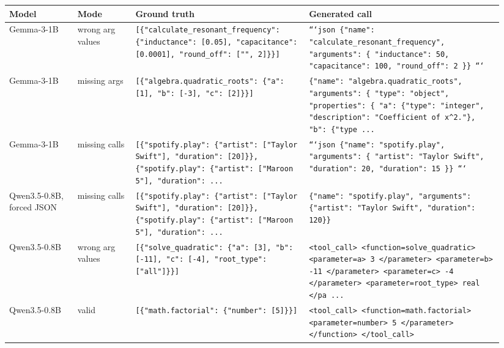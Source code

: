 \begin{tabular}{@{}p{0.13\linewidth}p{0.11\linewidth}p{0.33\linewidth}p{0.37\linewidth}@{}}
\toprule
Model & Mode & Ground truth & Generated call \\
\midrule
Gemma-3-1B & wrong arg values & \raggedright\texttt{[\{"calculate\_\allowbreak{}resonant\_\allowbreak{}frequency": \{"inductance": [0.05], "capacitance": [0.0001], "round\_\allowbreak{}off": ["", 2]\}\}]} & \texttt{```json \{"name": "calculate\_\allowbreak{}resonant\_\allowbreak{}frequency", "arguments": \{ "inductance": 50, "capacitance": 100, "round\_\allowbreak{}off": 2 \}\} ```} \\
Gemma-3-1B & missing args & \raggedright\texttt{[\{"algebra.quadratic\_\allowbreak{}roots": \{"a": [1], "b": [-3], "c": [2]\}\}]} & \texttt{\{"name": "algebra.quadratic\_\allowbreak{}roots", "arguments": \{ "type": "object", "properties": \{ "a": \{"type": "integer", "description": "Coefficient of x\^{}2."\}, "b": \{"type ...} \\
Gemma-3-1B & missing calls & \raggedright\texttt{[\{"spotify.play": \{"artist": ["Taylor Swift"], "duration": [20]\}\}, \{"spotify.play": \{"artist": ["Maroon 5"], "duration": ...} & \texttt{```json \{"name": "spotify.play", "arguments": \{ "artist": "Taylor Swift", "duration": 20, "duration": 15 \}\} ```} \\
Qwen3.5-0.8B, forced JSON & missing calls & \raggedright\texttt{[\{"spotify.play": \{"artist": ["Taylor Swift"], "duration": [20]\}\}, \{"spotify.play": \{"artist": ["Maroon 5"], "duration": ...} & \texttt{\{"name": "spotify.play", "arguments": \{"artist": "Taylor Swift", "duration": 120\}\}} \\
Qwen3.5-0.8B & wrong arg values & \raggedright\texttt{[\{"solve\_\allowbreak{}quadratic": \{"a": [3], "b": [-11], "c": [-4], "root\_\allowbreak{}type": ["all"]\}\}]} & \texttt{<tool\_\allowbreak{}call> <function=solve\_\allowbreak{}quadratic> <parameter=a> 3 </parameter> <parameter=b> -11 </parameter> <parameter=c> -4 </parameter> <parameter=root\_\allowbreak{}type> real </pa ...} \\
Qwen3.5-0.8B & valid & \raggedright\texttt{[\{"math.factorial": \{"number": [5]\}\}]} & \texttt{<tool\_\allowbreak{}call> <function=math.factorial> <parameter=number> 5 </parameter> </function> </tool\_\allowbreak{}call>} \\
\bottomrule
\end{tabular}
